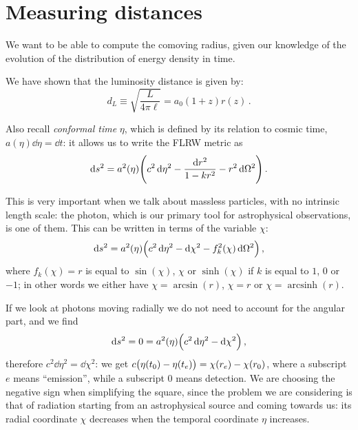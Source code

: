 \documentclass[main.tex]{subfiles}
\begin{document}


\section{Measuring distances} \label{sec:measuring-distances}

We want to be able to compute the comoving radius, given our knowledge of the evolution of the distribution of energy density in time.

We have shown that the luminosity distance is given by:
%
\begin{equation}
  d_L \equiv \sqrt{\frac{L}{4 \pi \ell}}
  = a_0 (1+z) r(z)
\,.
\end{equation}

Also recall \emph{conformal time} \(\eta\), which is defined by its relation to cosmic time, \(a(\eta ) \dd{\eta} = \dd{t}\): it allows us to write the FLRW metric as
%
\begin{equation}
  \dd{s^2} = a^2(\eta ) \qty(c^2 \dd{\eta^2} - \frac{\dd{r^2} }{1 - k r^2} - r^2 \dd{\Omega^2} )
\,.
\end{equation}

This is very important when we talk about massless particles, with no intrinsic length scale: the photon, which is our primary tool for astrophysical observations, is one of them.
This can be written in terms of the variable \(\chi\): 
%
\begin{equation}
  \dd{s^2}  = a^2(\eta ) \qty(c^2 \dd{\eta^2} - \dd{\chi^2} - f^2_k (\chi ) \dd{\Omega^2})
\,,
\end{equation}
%
where \(f_k(\chi )=r\) is equal to \(\sin(\chi ) \), \(\chi \) or \(\sinh(\chi )\) if \(k\) is equal to \(1\), \(0\) or \(-1\); in other words we either have \(\chi = \arcsin(r)\), \(\chi = r\) or \(\chi = \operatorname{arcsinh}(r)\).

If we look at photons moving radially we do not need to account for the angular part, and we find
%
\begin{equation}
  \dd{s^2} = 0 = a^2(\eta ) \qty(c^2 \dd{\eta^2} - \dd{\chi^2})
\,,
\end{equation}
%
therefore \(c^2 \dd{\eta^2} = \dd{\chi^2}\):  we get \(c \qty(\eta (t_0 ) - \eta (t_e)) = \chi (r_e) - \chi (r_0 )\), where a subscript \(e\) means ``emission'', while a subscript \(0\) means detection. 
We are choosing the negative sign when simplifying the square, since the problem we are considering is that of radiation starting from an astrophysical source and coming towards us: its radial coordinate \(\chi \) decreases when the temporal coordinate \(\eta \) increases. 
\end{document}
